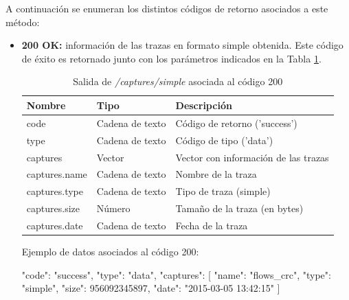 A continuación se enumeran los distintos códigos de retorno asociados a este método:
\begin{itemize}

\item{\textbf{200 OK:} información de las \glspl{traza} en formato \gls{simple} obtenida. Este código de éxito es retornado junto con los parámetros indicados en la Tabla \ref{extra:api:capturessimple:ok}.
\begin{table}[H]
\centering
\begin{tabular}{|l|l|l|}
\hline
\rowcolor[HTML]{F5F5F5}
\textbf{Nombre}                & \textbf{Tipo}   & \textbf{Descripción}                            \\ \hline
code                           & Cadena de texto & Código de retorno ('success')                   \\ \hline
type                           & Cadena de texto & Código de tipo ('data')                         \\ \hline
captures                       & Vector          & Vector con información de las \glspl{traza}     \\ \hline
captures.name                  & Cadena de texto & Nombre de la \gls{traza}                        \\ \hline
captures.type                  & Cadena de texto & Tipo de \gls{traza} (\gls{simple})              \\ \hline
captures.size                  & Número          & Tamaño de la \gls{traza} (en bytes)             \\ \hline
captures.date                  & Cadena de texto & Fecha de la \gls{traza}                         \\ \hline
\end{tabular}
\caption{Salida de \textit{/captures/simple} asociada al código 200}
\label{extra:api:capturessimple:ok}
\end{table}
\begin{minipage}{\textwidth}
Ejemplo de datos asociados al código 200:

\begin{code}[language=json]
{
  "code": "success",
  "type": "data",
  "captures": [
    {
      "name": "flows_crc",
      "type": "simple",
      "size": 956092345897,
      "date": "2015-03-05 13:42:15"
    }
  ]
}
\end{code}
\end{minipage}
}

\end{itemize}

